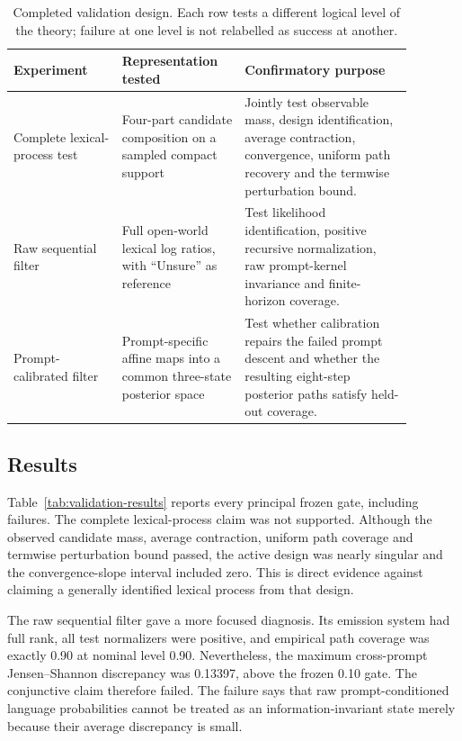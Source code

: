 \documentclass[11pt]{article}
\begin{document}
\begin{table}[H]
\centering
\caption{Completed validation design.  Each row tests a different logical
level of the theory; failure at one level is not relabelled as success at
another.}
\label{tab:validation-design}
\small
\begin{tabular}{p{0.24\linewidth}p{0.27\linewidth}p{0.37\linewidth}}
\toprule
Experiment & Representation tested & Confirmatory purpose\\
\midrule
Complete lexical-process test &
Four-part candidate composition on a sampled compact support &
Jointly test observable mass, design identification, average contraction,
convergence, uniform path recovery and the termwise perturbation bound.\\
Raw sequential filter &
Full open-world lexical log ratios, with ``Unsure'' as reference &
Test likelihood identification, positive recursive normalization, raw
prompt-kernel invariance and finite-horizon coverage.\\
Prompt-calibrated filter &
Prompt-specific affine maps into a common three-state posterior space &
Test whether calibration repairs the failed prompt descent and whether the
resulting eight-step posterior paths satisfy held-out coverage.\\
\bottomrule
\end{tabular}
\end{table}

\subsection{Results}

Table~\ref{tab:validation-results} reports every principal frozen gate,
including failures.  The complete lexical-process claim was not supported.
Although the observed candidate mass, average contraction, uniform path
coverage and termwise perturbation bound passed, the active design was nearly
singular and the convergence-slope interval included zero.  This is direct
evidence against claiming a generally identified lexical process from that
design.

The raw sequential filter gave a more focused diagnosis.  Its emission system
had full rank, all test normalizers were positive, and empirical path coverage
was exactly 0.90 at nominal level 0.90.  Nevertheless, the maximum
cross-prompt Jensen--Shannon discrepancy was 0.13397, above the frozen 0.10
gate.  The conjunctive claim therefore failed.  The failure says that raw
prompt-conditioned language probabilities cannot be treated as an
information-invariant state merely because their average discrepancy is
small.
\end{document}

